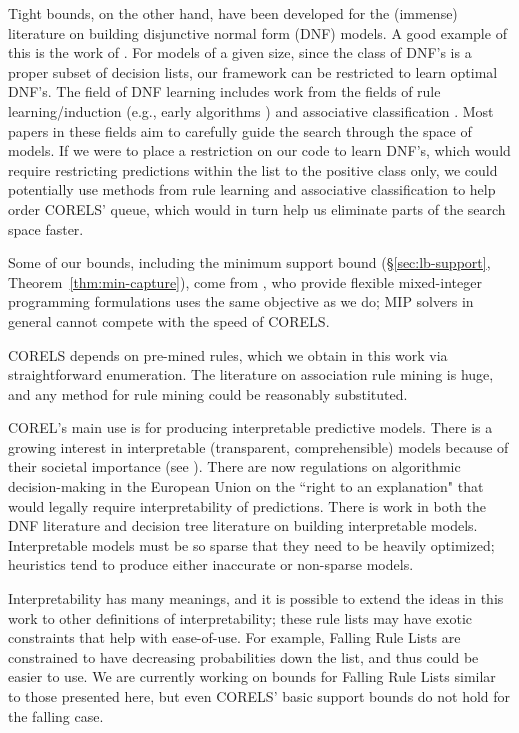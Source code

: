 Tight bounds, on the other hand, have been developed for the (immense) literature on building disjunctive normal form (DNF) models. A good example of this is the work of \citet{Rijnbeek10}.
For models of a given size, since the class of DNF's is a proper subset of decision lists, our framework can be restricted to learn optimal DNF's. The field of DNF learning includes work from the fields of rule learning/induction (e.g., early algorithms \citep{Michalski1969,ClarkNiblett1989,Frank1998}) and associative classification \citep{Vanhoof10}. Most papers in these fields aim to carefully guide the search through the space of models. If we were to place a restriction on our code to learn DNF's, which would require restricting predictions within the list to the positive class only, we could potentially use methods from rule learning and associative classification to help order CORELS' queue, which would in turn help us eliminate parts of the search space faster. 

Some of our bounds, including the minimum support bound (\S\ref{sec:lb-support}, Theorem~\ref{thm:min-capture}), come from \citep{RudinEr15}, who provide flexible mixed-integer programming formulations uses the same objective as we do; MIP solvers in general cannot compete with the speed of CORELS.

CORELS depends on pre-mined rules, which we obtain in this work via straightforward enumeration.
The literature on association rule mining is huge, and any method for rule mining could be reasonably substituted.

COREL's main use is for producing interpretable predictive models. There is a growing interest in interpretable (transparent, comprehensible) models because of their societal importance (see \citep{ruping2006learning,bratko1997machine,dawes1979robust,VellidoEtAl12,Giraud98,Holte93,Schmueli10,Huysmans11,Freitas14}). There are now regulations on algorithmic decision-making in the European Union on the ``right to an explanation" \citep{Goodman2016EU} that would legally require interpretability of predictions. There is work in both the DNF literature \citep{Ruckert2008} and decision tree literature \cite{GarofalakisHyRaSh00} on building interpretable models. Interpretable models must be so sparse that they need to be heavily optimized; heuristics tend to produce either inaccurate or non-sparse models.

Interpretability has many meanings, and it is possible to extend the ideas in this work to other definitions of interpretability; these rule lists may have exotic constraints that help with ease-of-use. For example, Falling Rule Lists \citep{WangRu15} are constrained to have decreasing probabilities down the list, and thus could be easier to use. We are currently working on bounds for Falling Rule Lists \citep{ChenRu17} similar to those presented here, but even CORELS' basic support bounds do not hold for the falling case. 

